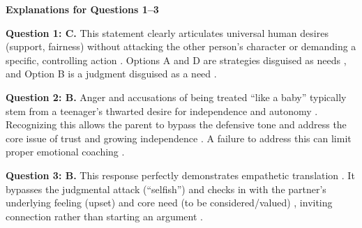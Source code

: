 \begin{practiceexercise}
\textbf{Explanations for Questions 1--3}

\textbf{Question 1: C.} This statement clearly articulates universal human desires (support, fairness) without attacking the other person's character or demanding a specific, controlling action \citep{dunn2000}. Options A and D are strategies disguised as needs \citep{kabatzinn1990}, and Option B is a judgment disguised as a need \citep{rogers1961}.

\textbf{Question 2: B.} Anger and accusations of being treated ``like a baby'' typically stem from a teenager's thwarted desire for independence and autonomy \citep{thomas1977}. Recognizing this allows the parent to bypass the defensive tone and address the core issue of trust and growing independence \citep{lazarus1991}. A failure to address this can limit proper emotional coaching \citep{gottman1997}.

\textbf{Question 3: B.} This response perfectly demonstrates empathetic translation \citep{siegel2011}. It bypasses the judgmental attack (``selfish'') and checks in with the partner's underlying feeling (upset) and core need (to be considered/valued) \citep{rosenberg2003}, inviting connection rather than starting an argument \citep{greene1998}.
\vspace{\fill}
\newpage
\end{practiceexercise}
